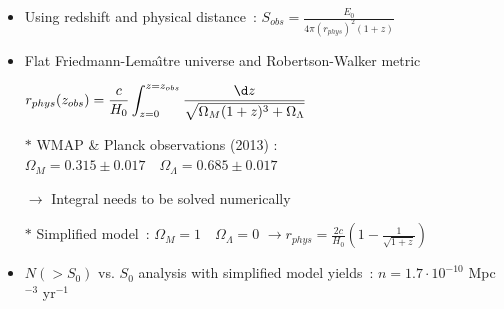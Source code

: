 \Tr
\onecolumn

\begin{itemize}
\item Using redshift and physical distance~:
      $\displaystyle S_{obs}=\frac{E_{0}}{4\pi (r_{phys})^{2}(1+z)}$\\[1mm]
\item Flat Friedmann-Lema\^{\i}tre universe and Robertson-Walker metric\\[1mm]
\item[] $\displaystyle r_{phys}(z_{obs})=\frac{c}{H_{0}}
        \int_{z=0}^{z=z_{obs}} \frac{\d z}{\sqrt{\Omega_{M}(1+z)^{3}+\Omega_{\Lambda}}}$\\[1mm]
\item[$\ast$] WMAP \& Planck observations (2013) : $\Omega_{M}=0.315 \pm 0.017 \quad \Omega_{\Lambda}=0.685 \pm 0.017$
\item[] $\rightarrow$ Integral needs to be solved numerically
\item[$\ast$] Simplified model~: $\Omega_{M}=1 \quad \Omega_{\Lambda}=0$
              $\displaystyle \rightarrow r_{phys}=\frac{2c}{H_{0}}\left( 1-\frac{1}{\sqrt{1+z}} \right)$\\[1mm]
\item $N(>S_{0})$ vs. $S_{0}$ analysis with simplified model yields~:
      $n=1.7 \cdot 10^{-10}$ Mpc$^{-3}$ yr$^{-1}$
\end{itemize}

\twocolumn
